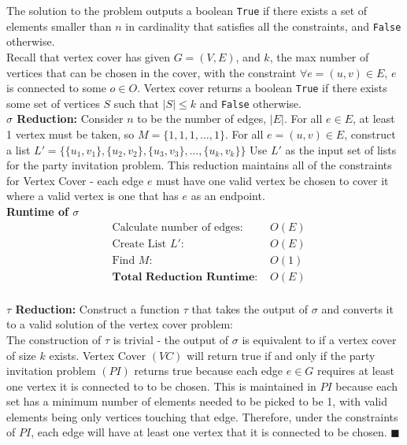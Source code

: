 \documentclass[11pt]{article}
\begin{document}
The solution to the problem outputs a boolean \texttt{True} if there exists a set of elements smaller than $n$ in cardinality  that satisfies all the constraints, and \texttt{False} otherwise.\\

Recall that vertex cover has given $G = (V,E)$, and $k$, the max number of vertices that can be chosen in the cover, with the constraint $\forall e = (u,v) \in E$, $e$ is connected to some $o \in O$. Vertex cover returns a boolean \texttt{True} if there exists some set of vertices $S$ such that $|S| \leq k $ and \texttt{False} otherwise. \\

\textbf{$\sigma$ Reduction:}
Consider $n$ to be the number of edges, $|E|$. For all $e \in E$, at least 1 vertex must be taken, so $M = \{1,1,1,\ldots, 1\}$. For all $e = (u,v) \in E$, construct a list $L' = \{\{u_1,v_1\},\{u_2,v_2\},\{u_3,v_3\},\ldots, \{u_k,v_k\}\}$ Use $L'$ as the input set of lists for the party invitation problem. This reduction maintains all of the constraints for Vertex Cover -  each edge $e$ must have one valid vertex be chosen to cover it where a valid vertex is one that has $e$ as an endpoint. \\

\textbf{Runtime of $\sigma$}
\begin{align*}
&\text{Calculate number of edges: } &O(E)\\ 
&\text{Create List $L'$: } &O(E)\\ 
&\text{Find $M$: } &O(1)\\
&\textbf{Total Reduction Runtime: } &O(E)\\
\end{align*}

\textbf{$\tau$ Reduction:}
Construct a function $\tau$ that takes the output of $\sigma$ and converts it to a valid solution of the vertex cover problem:\\

The construction of $\tau$ is trivial - the output of $\sigma$ is equivalent to if a vertex cover of size $k$ exists. Vertex Cover $(VC)$  will return true if and only if the party invitation problem $(PI)$ returns true because each edge $e \in G$ requires at least one vertex it is connected to to be chosen. This is maintained in $PI$ because each set has a minimum number of elements needed to be picked to be 1, with valid elements being only vertices touching that edge. Therefore, under the constraints of $PI$, each edge will have at least one vertex that it is connected to be chosen. $\blacksquare$ \\
\end{document}
